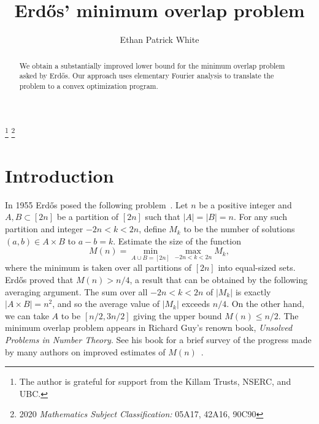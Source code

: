\documentclass[12pt]{article}
\title{Erd\H{o}s' minimum overlap problem}
\author{Ethan Patrick White}
\date{}
\numberwithin{equation}{section}
\begin{document}
\maketitle


\begin{abstract}
We obtain a substantially improved lower bound for the minimum overlap problem asked by Erd\H{o}s. Our approach uses elementary Fourier analysis to translate the problem to a convex optimization program. 

\end{abstract}

\let\thefootnote\relax\footnote{The author is grateful for support from the Killam Trusts, NSERC, and UBC.}
\let\thefootnote\relax\footnote{2020 \emph{Mathematics Subject Classification:} 05A17, 42A16, 90C90 }




\section{Introduction}

In 1955 Erd\H{o}s posed the following problem~\cite{E}. Let $n$ be a positive integer and $A,B \subset [2n]$ be a partition of $[2n]$ such that $|A|=|B| = n$. For any such partition and integer $-2n<k<2n$, define $M_k$ to be the number of solutions $(a,b) \in A  \times B$ to $a-b = k$. Estimate the size of the function
\[ M(n) = \min_{A\cup B = [2n]} \max_{-2n<k<2n} M_k,\]
where the minimum is taken over all partitions of $[2n]$ into equal-sized sets. Erd\H{o}s proved that $M(n)>n/4$, a result that can be obtained by the following averaging argument. The sum over all $-2n<k<2n$ of $|M_k|$ is exactly $|A \times B| = n^2$, and so the average value of $|M_k|$ exceeds $n/4$. On the other hand, we can take $A$ to be $[n/2,3n/2]$ giving the upper bound $M(n) \leq n/2$. The minimum overlap problem appears in Richard Guy's renown book, \emph{Unsolved Problems in Number Theory}. See his book for a brief survey of the progress made by many authors on improved estimates of $M(n)$~\cite{RKG}.
\end{document}
